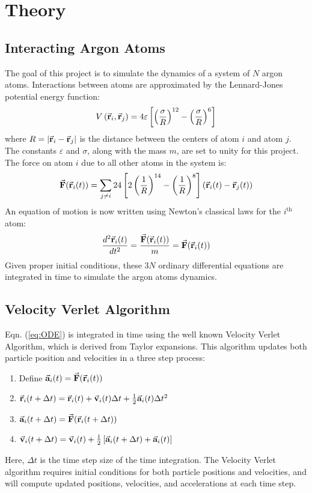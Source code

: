 \documentclass[12pt,oneside,a4paper]{article}
\newcommand{\br}{\vec {\bf r}}
\newcommand{\bv}{\vec {\bf v}}
\newcommand{\ba}{\vec {\bf a}}
\newcommand{\bF}{\vec {\bf F}}
\newcommand{\dt}{\Delta t}
\begin{document}
\section{Theory}

\subsection{Interacting Argon Atoms}

The goal of this project is to simulate the dynamics of a system of $N$ argon atoms.  Interactions between atoms are approximated by the Lennard-Jones potential energy function:
\begin{equation}
\label{eq:LJ_PTE}
V\left(\br_i, \br_j\right) = 4\varepsilon \left[\left(\frac{\sigma}{R}\right)^{12} - \left(\frac{\sigma}{R}\right)^{6}\right]
\end{equation}
where $R = |\br_i-\br_j|$ is the distance between the centers of atom $i$ and atom $j$.  The constants $\varepsilon$ and $\sigma$, along with the mass $m$, are set to unity for this project.  The force on atom $i$ due to all other atoms in the system is:
\begin{equation}
\bF(\br_i(t)) = \sum\limits_{j\neq i} 24\left[2\left(\frac{1}{R}\right)^{14} - \left(\frac{1}{R}\right)^{8}\right]\left(\br_i(t)-\br_j(t)\right)
\end{equation}
An equation of motion is now written using Newton's classical laws for the $i^\text{th}$ atom:
\begin{equation}
\label{eq:ODE}
\frac{d^2 \br_i(t)}{dt^2} = \frac{\bF(\br_i(t))}{m} = \bF(\br_i(t))
\end{equation}
Given proper initial conditions, these $3N$ ordinary differential equations are integrated in time to simulate the argon atoms dynamics.

\subsection{Velocity Verlet Algorithm}

Eqn. (\ref{eq:ODE}) is integrated in time using the well known Velocity Verlet Algorithm, which is derived from Taylor expansions.  This algorithm updates both particle position and velocities in a three step process:
\begin{enumerate}
	\item Define $\ba_i(t) = \bF(\br_i(t))$
	\item $\br_i(t+\dt) = \br_i(t) + \bv_i(t)\dt + \frac{1}{2}\ba_i(t)\dt^2$
	\item $\ba_i(t+\dt) = \bF(\br_i(t+\dt))$
	\item $\bv_i(t+\dt) = \bv_i(t) + \frac{1}{2}\left[\ba_i(t+\dt)+\ba_i(t)\right]$
\end{enumerate}
Here, $\dt$ is the time step size of the time integration.  The Velocity Verlet algorithm requires initial conditions for both particle positions and velocities, and will compute updated positions, velocities, and accelerations at each time step.
\end{document}
